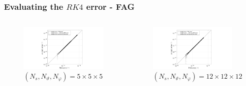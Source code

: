 \documentclass{beamer}
\begin{document}
\begin{frame}
\frametitle{Evaluating the $RK4$ error - FAG}
\vspace{-1.5cm}
\begin{columns}[onlytextwidth]
	\begin{column}{0.5\textwidth}
		\begin{center}
			\begin{figure}
				\includegraphics[trim={9cm 0cm 10cm 0cm},clip,width=1\textwidth]{FIGURES/RK4_alpha555_SFC.pdf}
				\caption{$(N_s,N_\vartheta,N_\varphi)= 5\times5\times5$}
				
			\end{figure}
		\end{center}
	\end{column}
	\begin{column}{0.5\textwidth}
		\vspace{0cm}
		\begin{center}
			\begin{figure}
				\includegraphics[trim={9cm 0cm 10cm 0cm},clip,width=1\textwidth]{FIGURES/RK4_alpha121212_SFC.pdf}
				\caption{$(N_s,N_\vartheta,N_\varphi)= 12\times12\times12$}
			\end{figure}
		\end{center}
	\end{column}
\end{columns}
\end{frame}
\end{document}
